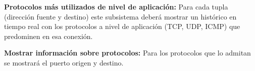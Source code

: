 \begin{functional}
        \setcounter{enumi}{7}
        \item \textbf{Protocolos más utilizados de nivel de aplicación:} Para cada tupla (dirección fuente y destino) este subsistema deberá mostrar un histórico en tiempo real con los protocolos a nivel de aplicación (TCP, UDP, ICMP) que predominen en esa conexión.
        \item \textbf{Mostrar información sobre protocolos:} Para los protocolos que lo admitan se mostrará el puerto origen y destino.
\end{functional}

